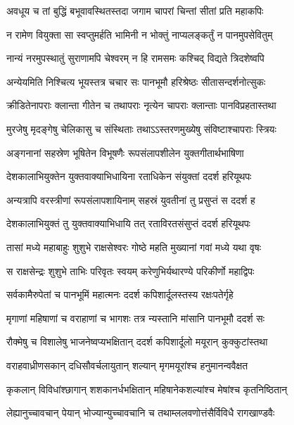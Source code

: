 
\twolineshloka
{अवधूय च तां बुद्धिं बभूवावस्थितस्तदा}
{जगाम चापरां चिन्तां सीतां प्रति महाकपिः} %

\twolineshloka
{न रामेण वियुक्ता सा स्वप्तुमर्हति भामिनी}
{न भोक्तुं नाप्यलङ्कर्तुं न पानमुपसेवितुम्} %

\twolineshloka
{नान्यं नरमुपस्थातुं सुराणामपि चेश्वरम्}
{न हि रामसमः कश्चिद् विद्यते त्रिदशेष्वपि} %

\twolineshloka
{अन्येयमिति निश्चित्य भूयस्तत्र चचार सः}
{पानभूमौ हरिश्रेष्ठः सीतासन्दर्शनोत्सुकः} %

\twolineshloka
{क्रीडितेनापराः क्लान्ता गीतेन च तथापराः}
{नृत्येन चापराः क्लान्ताः पानविप्रहतास्तथा} %

\twolineshloka
{मुरजेषु मृदङ्गेषु चेलिकासु च संस्थिताः}
{तथाऽऽस्तरणमुख्येषु संविष्टाश्चापराः स्त्रियः} %

\twolineshloka
{अङ्गनानां सहस्रेण भूषितेन विभूषणैः}
{रूपसंलापशीलेन युक्तगीतार्थभाषिणा} %

\twolineshloka
{देशकालाभियुक्तेन युक्तवाक्याभिधायिना}
{रताधिकेन संयुक्तां ददर्श हरियूथपः} %

\twolineshloka
{अन्यत्रापि वरस्त्रीणां रूपसंलापशायिनाम्}
{सहस्रं युवतीनां तु प्रसुप्तं स ददर्श ह} %

\twolineshloka
{देशकालाभियुक्तं तु युक्तवाक्याभिधायि तत्}
{रताविरतसंसुप्तं ददर्श हरियूथपः} %

\twolineshloka
{तासां मध्ये महाबाहुः शुशुभे राक्षसेश्वरः}
{गोष्ठे महति मुख्यानां गवां मध्ये यथा वृषः} %

\twolineshloka
{स राक्षसेन्द्रः शुशुभे ताभिः परिवृतः स्वयम्}
{करेणुभिर्यथारण्ये परिकीर्णो महाद्विपः} %

\twolineshloka
{सर्वकामैरुपेतां च पानभूमिं महात्मनः}
{ददर्श कपिशार्दूलस्तस्य रक्षःपतेर्गृहे} %

\twolineshloka
{मृगाणां महिषाणां च वराहाणां च भागशः}
{तत्र न्यस्तानि मांसानि पानभूमौ ददर्श सः} %

\twolineshloka
{रौक्मेषु च विशालेषु भाजनेष्वप्यभक्षितान्}
{ददर्श कपिशार्दूलो मयूरान् कुक्कुटांस्तथा} %

\twolineshloka
{वराहवाध्रीणसकान् दधिसौवर्चलायुतान्}
{शल्यान् मृगमयूरांश्च हनुमानन्ववैक्षत} %

\twolineshloka
{कृकलान् विविधांश्छागान् शशकानर्धभक्षितान्}
{महिषानेकशल्यांश्च मेषांश्च कृतनिष्ठितान्} %

\twolineshloka
{लेह्यानुच्चावचान् पेयान् भोज्यान्युच्चावचानि च}
{तथाम्ललवणोत्तंसैर्विविधै रागखाण्डवैः} %

